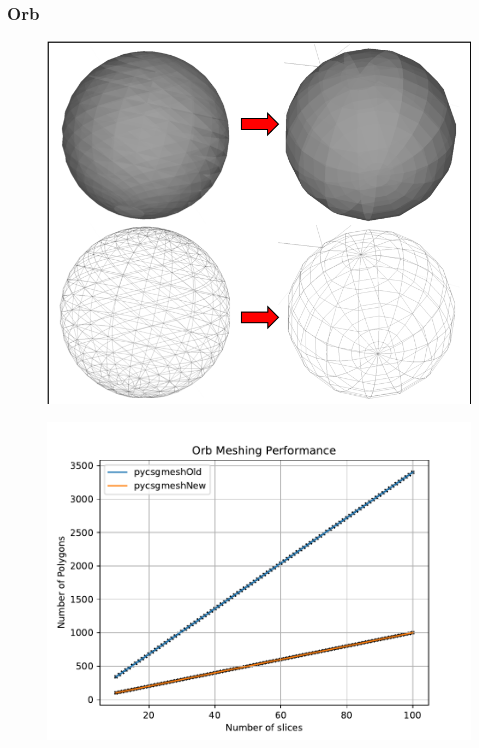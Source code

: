\documentclass[12pt,a4paper]{article}
\begin{document}
\newpage
\subsubsection{Orb}

\begin{figure}[h!]
\centering
\begin{minipage}{.2\textwidth}
  \centering
  \includegraphics[height=0.8\linewidth]{Images//Meshes//orb.png}
  \label{Sphere}
\end{minipage}%
\begin{minipage}{.3\textwidth}
  \centering
  \includegraphics[scale=0.35]{Images//Quad_fits//orb_quad.pdf}
  \label{fig:test2}
\end{minipage}%
\end{figure}
\end{document}
